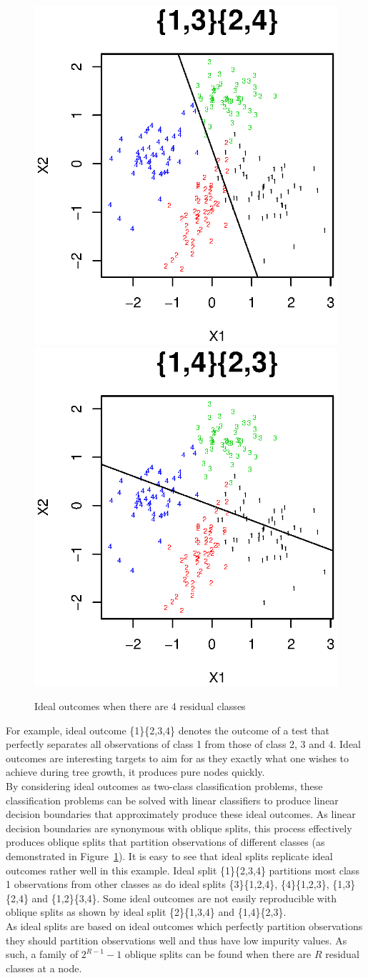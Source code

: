 \begin{figure}
\includegraphics*[width=.24\textwidth]{fig_superclass1_13.ps}
\includegraphics*[width=.24\textwidth]{fig_superclass1_14.ps}
\caption{Ideal outcomes when there are 4 residual classes}
\label{fig:superclass1}
\end{figure}

For example, ideal outcome \{1\}\{2,3,4\} denotes the outcome of a test that perfectly separates all observations of class 1 from those of class 2, 3 and 4. Ideal outcomes are interesting targets to aim for as they exactly what one wishes to achieve during tree growth, it produces pure nodes quickly. \\

By considering ideal outcomes as two-class classification problems, these classification problems can be solved with linear classifiers to produce linear decision boundaries that approximately produce these ideal outcomes. As linear decision boundaries are synonymous with oblique splits, this process effectively produces oblique splits that partition observations of different classes (as demonstrated in Figure~\ref{fig:superclass1}). It is easy to see that ideal splits replicate ideal outcomes rather well in this example. Ideal split \{1\}\{2,3,4\} partitions most class 1 observations from other classes as do ideal splits \{3\}\{1,2,4\}, \{4\}\{1,2,3\}, \{1,3\}\{2,4\} and \{1,2\}\{3,4\}. Some ideal outcomes are not easily reproducible with oblique splits as shown by ideal split \{2\}\{1,3,4\} and \{1,4\}\{2,3\}. \\

As ideal splits are based on ideal outcomes which perfectly partition observations they should partition observations well and thus have low impurity values. As such, a family of $2^{R-1}-1$ oblique splits can be found when there are $R$ residual classes at a node.

